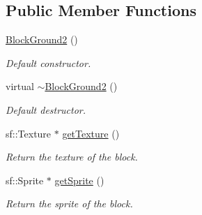 \subsection*{Public Member Functions}
\begin{DoxyCompactItemize}
\item 
\hypertarget{class_block_ground2_a75fe2a7e690505ea8be19912ecba70b0}{\hyperlink{class_block_ground2_a75fe2a7e690505ea8be19912ecba70b0}{Block\-Ground2} ()}\label{class_block_ground2_a75fe2a7e690505ea8be19912ecba70b0}

\begin{DoxyCompactList}\small\item\em Default constructor. \end{DoxyCompactList}\item 
\hypertarget{class_block_ground2_a1aaf60318df2772a7b073dd15bc15759}{virtual \hyperlink{class_block_ground2_a1aaf60318df2772a7b073dd15bc15759}{$\sim$\-Block\-Ground2} ()}\label{class_block_ground2_a1aaf60318df2772a7b073dd15bc15759}

\begin{DoxyCompactList}\small\item\em Default destructor. \end{DoxyCompactList}\item 
sf\-::\-Texture $\ast$ \hyperlink{class_block_ground2_a97ccf6ca4bbd7d0d45e4fb8550374bf7}{get\-Texture} ()
\begin{DoxyCompactList}\small\item\em Return the texture of the block. \end{DoxyCompactList}\item 
sf\-::\-Sprite $\ast$ \hyperlink{class_block_ground2_aa50914561a51632ac1ad389808e01a43}{get\-Sprite} ()
\begin{DoxyCompactList}\small\item\em Return the sprite of the block. \end{DoxyCompactList}\end{DoxyCompactItemize}
